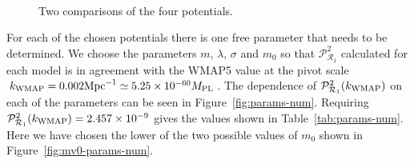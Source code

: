 \begin{figure}[htbp]
\centering%
\\%
\caption[Comparisons of the Potentials]{Two comparisons of the four potentials.}
\label{fig:cmp-pot-num}
\end{figure}


For each of the chosen potentials there is one free parameter that needs to be
determined.
We choose the parameters $m$, $\lambda$, $\sigma$ and $m_0$ so that
$\mathcal{P}^2_{\mathcal{R}_1}$ calculated
for each model is in agreement with the
WMAP5 value at the pivot scale
$k_\mathrm{WMAP}=0.002\mathrm{Mpc}^{-1} \simeq5.25\times10^{- 60} M_{\mathrm{PL}}$. 
The dependence of $\mathcal{P}^2_{\mathcal{R}_1}(k_\mathrm{WMAP})$ on each of the parameters
can be seen in
Figure~\ref{fig:params-num}.
Requiring $\mathcal{P}^2_{\mathcal{R}_1}(k_\mathrm{WMAP})=2.457\times 10^{-9}$
gives the values shown in Table~\ref{tab:params-num}. Here we have chosen the lower
of the two possible values of $m_0$ shown in Figure~\ref{fig:mv0-params-num}.



